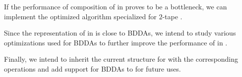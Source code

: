 If the performance of composition of \nfts in \noodler proves to be a bottleneck, we can implement the optimized algorithm specialized for $2$-tape \nfts.

Since the representation of \nfts in \mata is close to BDDAs, we intend to study various optimizations used for BDDAs to further improve the performance of \nfts in \mata.

Finally, we intend to inherit the current structure for \nfts with the corresponding operations and add support for BDDAs to \mata for future uses.



% 

